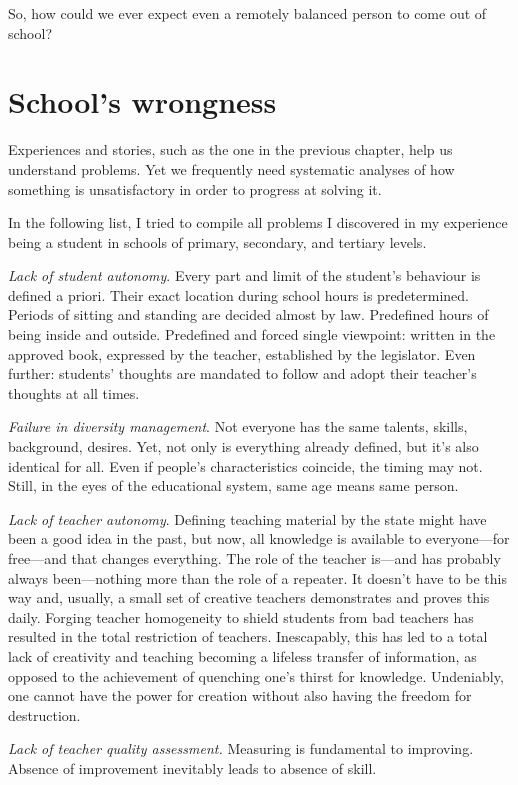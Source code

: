So, how could we ever expect even a remotely balanced person to come out of school?

\section{School’s wrongness}

Experiences and stories, such as the one in the previous chapter, help us understand problems. Yet we frequently need systematic analyses of how something is unsatisfactory in order to progress at solving it.

In the following list, I tried to compile all problems I discovered in my experience being a student in schools of primary, secondary, and tertiary levels.

\emph{Lack of student autonomy}. Every part and limit of the student’s behaviour is defined a priori. Their exact location during school hours is predetermined. Periods of sitting and standing are decided almost by law. Predefined hours of being inside and outside. Predefined and forced single viewpoint: written in the approved book, expressed by the teacher, established by the legislator. Even further: students’ thoughts are mandated to follow and adopt their teacher’s thoughts at all times.

\emph{Failure in diversity management}. Not everyone has the same talents, skills, background, desires. Yet, not only is everything already defined, but it’s also identical for all. Even if people’s characteristics coincide, the timing may not. Still, in the eyes of the educational system, same age means same person.

\emph{Lack of teacher autonomy}. Defining teaching material by the state might have been a good idea in the past, but now, all knowledge is available to everyone—for free—and that changes everything. The role of the teacher is—and has probably always been—nothing more than the role of a repeater. It doesn’t have to be this way and, usually, a small set of creative teachers demonstrates and proves this daily. Forging teacher homogeneity to shield students from bad teachers has resulted in the total restriction of teachers. Inescapably, this has led to a total lack of creativity and teaching becoming a lifeless transfer of information, as opposed to the achievement of quenching one’s thirst for knowledge. Undeniably, one cannot have the power for creation without also having the freedom for destruction.

\emph{Lack of teacher quality assessment.} Measuring is fundamental to improving. Absence of improvement inevitably leads to absence of skill.

